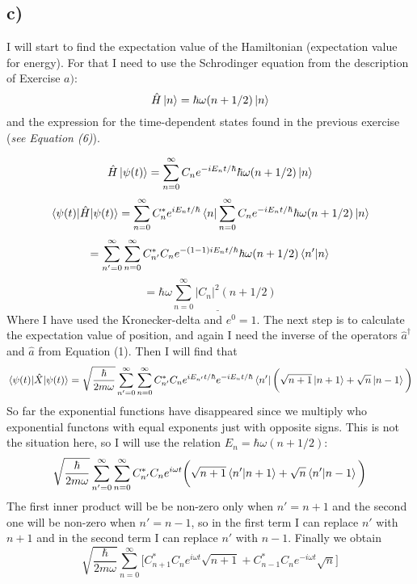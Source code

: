 \documentclass{scrartcl}
\begin{document}
\subsection*{c)}
I will start to find the expectation value of the Hamiltonian (expectation value for energy). For that I need to use the Schrodinger equation from the description of Exercise $a)$:
\begin{equation}
\hat{H}\ket{n}=\hbar\omega(n+1/2)\ket{n}
\end{equation}
and the expression for the time-dependent states found in the previous exercise (\textit{see Equation (6)}).\par\vspace{3mm}
$$\hat{H}\ket{\psi(t)}=\sum_{n=0}^\infty C_ne^{-iE_nt/\hbar}\hbar\omega(n+1/2)\ket{n}$$
$$\mel{\psi(t)}{\hat{H}}{\psi(t)}=\sum_{n=0}^\infty C_n^*e^{iE_nt/\hbar}\bra{n}\sum_{n=0}^\infty C_ne^{-iE_nt/\hbar}\hbar\omega(n+1/2)\ket{n}$$
$$=\sum_{n'=0}^\infty \sum_{n=0}^\infty C_{n'}^*C_ne^{-(1-1)iE_nt/\hbar}\hbar\omega(n+1/2)\braket{n'}{n}$$
$$=\underline{\hbar\omega\sum_{n=0}^\infty |C_n|^2(n+1/2)}$$
Where I have used the Kronecker-delta and $e^0=1$.
The next step is to calculate the expectation value of position, and again I need the inverse of the operators $\hat{a}^\dagger$ and $\hat{a}$ from Equation (1). Then I will find that
$$\mel{\psi(t)}{\hat{X}}{\psi(t)}=\sqrt{\frac{\hbar}{2m\omega}}\sum_{n'=0}^\infty \sum_{n=0}^\infty C_{n'}^*C_n e^{iE_{n'}t/\hbar}e^{-iE_nt/\hbar}\bra{n'}\bigg(\sqrt{n+1}\ket{n+1}+\sqrt{n}\ket{n-1}\bigg)$$
So far the exponential functions have disappeared since we multiply who exponential functons with equal exponents just with opposite signs. This is not the situation here, so I will use the relation $E_n=\hbar\omega(n+1/2)$:
$$\sqrt{\frac{\hbar}{2m\omega}}\sum_{n'=0}^\infty \sum_{n=0}^\infty C_{n'}^*C_n e^{i\omega t}\bigg(\sqrt{n+1}\braket{n'}{n+1}+\sqrt{n}\braket{n'}{n-1}\bigg)$$
The first inner product will be be non-zero only when $n'=n+1$ and the second one will be non-zero when $n'=n-1$, so in the first term I can replace  $n'$ with $n+1$ and in the second term I can replace $n'$ with $n-1$. Finally we obtain 
\begin{equation}
\sqrt{\frac{\hbar}{2m\omega}}\sum_{n=0}^\infty\bigg[C_{n+1}^*C_ne^{i\omega t}\sqrt{n+1}+C_{n-1}^*C_ne^{-i\omega t}\sqrt{n}\bigg]
\end{equation}
\end{document}

